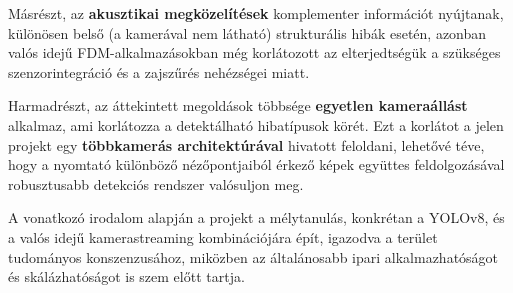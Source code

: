 Másrészt, az \textbf{akusztikai megközelítések} komplementer információt nyújtanak, különösen
belső (a kamerával nem látható) strukturális hibák esetén, azonban valós idejű FDM-alkalmazásokban
még korlátozott az elterjedtségük a szükséges szenzorintegráció és a zajszűrés nehézségei miatt.

Harmadrészt, az áttekintett megoldások többsége \textbf{egyetlen kameraállást} alkalmaz, ami
korlátozza a detektálható hibatípusok körét. Ezt a korlátot a jelen projekt egy
\textbf{többkamerás architektúrával} hivatott feloldani, lehetővé téve, hogy a nyomtató különböző
nézőpontjaiból érkező képek együttes feldolgozásával robusztusabb detekciós rendszer valósuljon meg.

A vonatkozó irodalom alapján a projekt a mélytanulás, konkrétan a YOLOv8, és a valós idejű
kamerastreaming kombinációjára épít, igazodva a terület tudományos konszenzusához, miközben az
általánosabb ipari alkalmazhatóságot és skálázhatóságot is szem előtt tartja.
